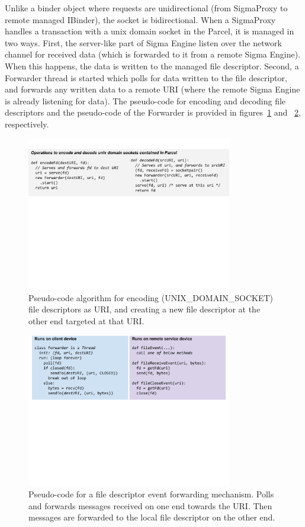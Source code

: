 \documentclass[prodmode]{acmlarge}
\begin{document}
Unlike a binder object where requests are unidirectional (from SigmaProxy to remote managed IBinder), the socket is bidirectional. When a SigmaProxy handles a transaction with a unix domain socket in the Parcel, it is managed in two ways. First, the server-like part of Sigma Engine listen over the network channel for received data (which is forwarded to it from a remote Sigma Engine). When this happens, the data is written to the managed file descriptor. Second, a Forwarder thread is started which polls for data written to the file descriptor, and forwards any written data to a remote URI (where the remote Sigma Engine is already listening for data). The pseudo-code for encoding and decoding file descriptors and the pseudo-code of the Forwarder is provided in figures~\ref{fig:encodeFds} and ~\ref{fig:fdForwarder}, respectively.

\begin{figure}[h]
\centering
\includegraphics[width=0.8\textwidth]{drawings/encodeFds.pdf}
\caption{Pseudo-code algorithm for encoding (UNIX\_DOMAIN\_SOCKET) file descriptors as URI, and creating a new file descriptor at the other end targeted at that URI.}
\label{fig:encodeFds}
\end{figure}

\begin{figure}[h]
\centering
\includegraphics[width=0.8\textwidth]{drawings/forwardFds.pdf}
\caption{Pseudo-code for a file descriptor event forwarding mechanism. Polls and forwards messages received on one end towards the URI. Then messages are forwarded to the local file descriptor on the other end.}
\label{fig:fdForwarder}
\end{figure}
\end{document}
